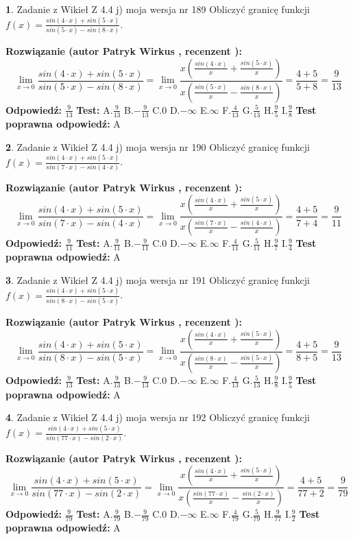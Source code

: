 \documentclass[12pt, a4paper]{article}
\theoremstyle{definition} %
\newtheorem{zad}{}
\newcommand{\zadStart}[1]{\begin{zad}#1\newline}
\newcommand{\zadStop}{\end{zad}}
\newcommand{\rozwStart}[2]{\noindent \textbf{Rozwiązanie (autor #1 , recenzent #2): }\newline}
\newcommand{\rozwStop}{\newline}
\newcommand{\odpStart}{\noindent \textbf{Odpowiedź:}\newline}
\newcommand{\odpStop}{\newline}
\newcommand{\testStart}{\noindent \textbf{Test:}\newline}
\newcommand{\testStop}{\newline}
\newcommand{\kluczStart}{\noindent \textbf{Test poprawna odpowiedź:}\newline}
\newcommand{\kluczStop}{\newline}
\begin{document}
\zadStart{Zadanie z Wikieł Z 4.4 j) moja wersja nr 189}
Obliczyć granicę funkcji $f(x)=\frac{sin(4\cdot x) +sin(5\cdot x)}{sin(5\cdot x) -sin(8\cdot x)}$.
\zadStop
\rozwStart{Patryk Wirkus}{}
$$\lim\limits_{x\to 0}\frac{sin(4\cdot x) +sin(5\cdot x)}{sin(5\cdot x) -sin(8\cdot x)}=\lim\limits_{x\to 0}\frac{x(\frac{sin(4\cdot x)}{x}+\frac{sin(5\cdot x)}{x})}{x(\frac{sin(5\cdot x)}{x}-\frac{sin(8\cdot x)}{x})}=\frac{4+5}{5+8} = \frac{9}{13}$$
\rozwStop
\odpStart
$\frac{9}{13}$
\odpStop
\testStart
A.$\frac{9}{13}$
B.$-\frac{9}{13}$
C.$0$
D.$-\infty$
E.$\infty$
F.$\frac{4}{13}$
G.$\frac{5}{13}$
H.$\frac{9}{5}$
I.$\frac{9}{8}$
\testStop
\kluczStart
A
\kluczStop



\zadStart{Zadanie z Wikieł Z 4.4 j) moja wersja nr 190}
Obliczyć granicę funkcji $f(x)=\frac{sin(4\cdot x) +sin(5\cdot x)}{sin(7\cdot x) -sin(4\cdot x)}$.
\zadStop
\rozwStart{Patryk Wirkus}{}
$$\lim\limits_{x\to 0}\frac{sin(4\cdot x) +sin(5\cdot x)}{sin(7\cdot x) -sin(4\cdot x)}=\lim\limits_{x\to 0}\frac{x(\frac{sin(4\cdot x)}{x}+\frac{sin(5\cdot x)}{x})}{x(\frac{sin(7\cdot x)}{x}-\frac{sin(4\cdot x)}{x})}=\frac{4+5}{7+4} = \frac{9}{11}$$
\rozwStop
\odpStart
$\frac{9}{11}$
\odpStop
\testStart
A.$\frac{9}{11}$
B.$-\frac{9}{11}$
C.$0$
D.$-\infty$
E.$\infty$
F.$\frac{4}{11}$
G.$\frac{5}{11}$
H.$\frac{9}{7}$
I.$\frac{9}{4}$
\testStop
\kluczStart
A
\kluczStop



\zadStart{Zadanie z Wikieł Z 4.4 j) moja wersja nr 191}
Obliczyć granicę funkcji $f(x)=\frac{sin(4\cdot x) +sin(5\cdot x)}{sin(8\cdot x) -sin(5\cdot x)}$.
\zadStop
\rozwStart{Patryk Wirkus}{}
$$\lim\limits_{x\to 0}\frac{sin(4\cdot x) +sin(5\cdot x)}{sin(8\cdot x) -sin(5\cdot x)}=\lim\limits_{x\to 0}\frac{x(\frac{sin(4\cdot x)}{x}+\frac{sin(5\cdot x)}{x})}{x(\frac{sin(8\cdot x)}{x}-\frac{sin(5\cdot x)}{x})}=\frac{4+5}{8+5} = \frac{9}{13}$$
\rozwStop
\odpStart
$\frac{9}{13}$
\odpStop
\testStart
A.$\frac{9}{13}$
B.$-\frac{9}{13}$
C.$0$
D.$-\infty$
E.$\infty$
F.$\frac{4}{13}$
G.$\frac{5}{13}$
H.$\frac{9}{8}$
I.$\frac{9}{5}$
\testStop
\kluczStart
A
\kluczStop



\zadStart{Zadanie z Wikieł Z 4.4 j) moja wersja nr 192}
Obliczyć granicę funkcji $f(x)=\frac{sin(4\cdot x) +sin(5\cdot x)}{sin(77\cdot x) -sin(2\cdot x)}$.
\zadStop
\rozwStart{Patryk Wirkus}{}
$$\lim\limits_{x\to 0}\frac{sin(4\cdot x) +sin(5\cdot x)}{sin(77\cdot x) -sin(2\cdot x)}=\lim\limits_{x\to 0}\frac{x(\frac{sin(4\cdot x)}{x}+\frac{sin(5\cdot x)}{x})}{x(\frac{sin(77\cdot x)}{x}-\frac{sin(2\cdot x)}{x})}=\frac{4+5}{77+2} = \frac{9}{79}$$
\rozwStop
\odpStart
$\frac{9}{79}$
\odpStop
\testStart
A.$\frac{9}{79}$
B.$-\frac{9}{79}$
C.$0$
D.$-\infty$
E.$\infty$
F.$\frac{4}{79}$
G.$\frac{5}{79}$
H.$\frac{9}{77}$
I.$\frac{9}{2}$
\testStop
\kluczStart
A
\kluczStop
\end{document}
